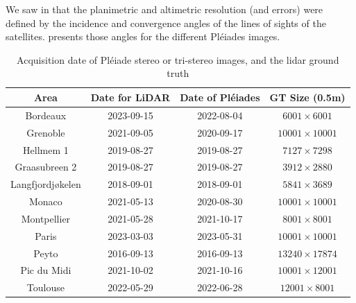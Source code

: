 We saw in  that the planimetric and altimetric resolution (and errors) were defined by the incidence and convergence angles of the lines of sights of the satellites.  presents those angles for the different Pléiades images.

\begin{table}[ht]
    \centering
    \begin{tabular}{|c||c|c|c|}
    \hline
        Area & Date for LiDAR & Date of Pléiades &  GT Size (0.5m)\\
        \hline\hline
        Bordeaux & 2023-09-15 & 2022-08-04 & $6001\times 6001$\\\hline
        Grenoble & 2021-09-05 & 2020-09-17 & $10 001\times 10 001$ \\\hline
        Hellmem 1 & 2019-08-27 & 2019-08-27 & $7127\times 7298$ \\\hline
        Graasubreen 2 & 2019-08-27 & 2019-08-27 & $3912\times2880$ \\\hline
        Langfjordjøkelen & 2018-09-01 & 2018-09-01 & $5841\times 3689$\\\hline
        Monaco & 2021-05-13 & 2020-08-30 & $10 001\times 10 001$\\\hline
        Montpellier & 2021-05-28 & 2021-10-17 & $8001\times 8001$\\\hline
        Paris & 2023-03-03 & 2023-05-31 & $10 001\times 10 001$\\\hline
        Peyto & 2016-09-13 & 2016-09-13 & $13240\times 17874$\\\hline
        Pic du Midi & 2021-10-02 & 2021-10-16 & $10001 \times 12001$ \\\hline
        Toulouse & 2022-05-29 & 2022-06-28 & $12001\times 8001$\\\hline
    \end{tabular}
    \caption{Acquisition date of Pléiade stereo or tri-stereo images, and the \acrshort{lidar} ground truth}
    \label{tab:dates_pleiades_lidar_hd}
\end{table}

